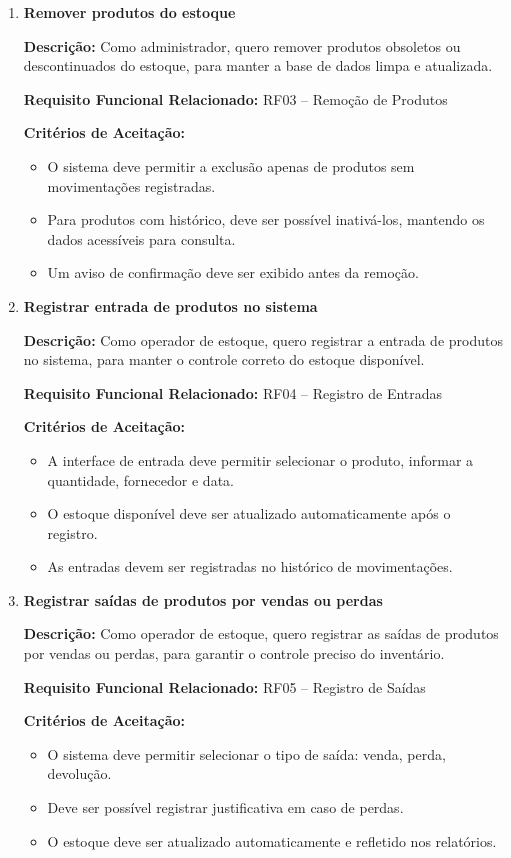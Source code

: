 \documentclass[
	12pt,				%
	openany,			%
	twoside,			%
	a4paper,			%
	english,			%
	brazil				%
	]{abntex2}
\begin{document}
\begin{enumerate}
\item \textbf{Remover produtos do estoque}

\textbf{Descrição:} Como administrador, quero remover produtos obsoletos ou descontinuados do estoque, para manter a base de dados limpa e atualizada.

\textbf{Requisito Funcional Relacionado:} RF03 -- Remoção de Produtos

\textbf{Critérios de Aceitação:}
\begin{itemize}
  \item O sistema deve permitir a exclusão apenas de produtos sem movimentações registradas.
  \item Para produtos com histórico, deve ser possível inativá-los, mantendo os dados acessíveis para consulta.
  \item Um aviso de confirmação deve ser exibido antes da remoção.
\end{itemize}

\item \textbf{Registrar entrada de produtos no sistema}

\textbf{Descrição:} Como operador de estoque, quero registrar a entrada de produtos no sistema, para manter o controle correto do estoque disponível.

\textbf{Requisito Funcional Relacionado:} RF04 -- Registro de Entradas

\textbf{Critérios de Aceitação:}
\begin{itemize}
  \item A interface de entrada deve permitir selecionar o produto, informar a quantidade, fornecedor e data.
  \item O estoque disponível deve ser atualizado automaticamente após o registro.
  \item As entradas devem ser registradas no histórico de movimentações.
\end{itemize}

\item \textbf{Registrar saídas de produtos por vendas ou perdas}

\textbf{Descrição:} Como operador de estoque, quero registrar as saídas de produtos por vendas ou perdas, para garantir o controle preciso do inventário.

\textbf{Requisito Funcional Relacionado:} RF05 -- Registro de Saídas

\textbf{Critérios de Aceitação:}
\begin{itemize}
  \item O sistema deve permitir selecionar o tipo de saída: venda, perda, devolução.
  \item Deve ser possível registrar justificativa em caso de perdas.
  \item O estoque deve ser atualizado automaticamente e refletido nos relatórios.
\end{itemize}


\end{enumerate}
\end{document}
